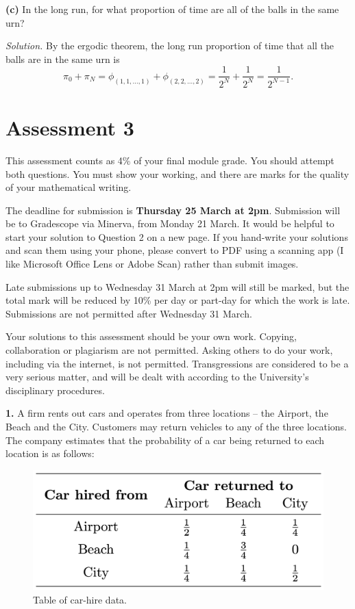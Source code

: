\documentclass[
  a4paper,
]{article}
\theoremstyle{definition}
\theoremstyle{definition}
\theoremstyle{definition}
\theoremstyle{remark}
\begin{document}
\textbf{(c)}
In the long run, for what proportion of time are all of the balls in the same urn?

\begin{myanswers}
\emph{Solution.} By the ergodic theorem, the long run proportion of time that all the balls are in the same urn is
\[ \pi_0 + \pi_N = \phi_{(1,1,\dots,1)} + \phi_{(2,2,\dots,2)} = \frac{1}{2^N} + \frac{1}{2^N} = \frac{1}{2^{N-1}} . \]

\end{myanswers}

\hypertarget{A3}{%
\section*{Assessment 3}\label{A3}}

This assessment counts as 4\% of your final module grade. You should attempt both questions. You must show your working, and there are marks for the quality of your mathematical writing.

The deadline for submission is \textbf{Thursday 25 March at 2pm}. Submission will be to Gradescope via Minerva, from Monday 21 March. It would be helpful to start your solution to Question 2 on a new page. If you hand-write your solutions and scan them using your phone, please convert to PDF using a scanning app (I like Microsoft Office Lens or Adobe Scan) rather than submit images.

Late submissions up to Wednesday 31 March at 2pm will still be marked, but the total mark will be reduced by 10\% per day or part-day for which the work is late. Submissions are not permitted after Wednesday 31 March.

Your solutions to this assessment should be your own work. Copying, collaboration or plagiarism are not permitted. Asking others to do your work, including via the internet, is not permitted. Transgressions are considered to be a very serious matter, and will be dealt with according to the University's disciplinary procedures.

\textbf{1.}
A firm rents out cars and operates from three locations -- the Airport, the Beach and the
City. Customers may return vehicles to any of the three locations.
The company estimates that the probability of a car being returned to each location is
as follows:

\begin{figure}

{\centering \includegraphics[width=0.5\linewidth]{assessments/car-hire} 

}

\caption{Table of car-hire data.}\label{fig:car-table}
\end{figure}
\end{document}
